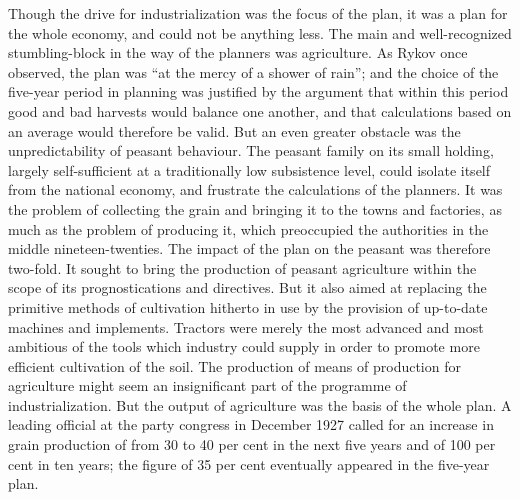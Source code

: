 Though the drive for industrialization was the focus of the plan, it was a plan for the whole economy, and could not be anything less. The main and well-recognized stumbling-block in the way of the planners was agriculture. As Rykov once observed, the plan was ``at the mercy of a shower of rain''; and the choice of the five-year period in planning was justified by the argument that within this period good and bad harvests would balance one another, and that calculations based on an average would therefore be valid. But an even greater obstacle was the unpredictability of peasant behaviour. The peasant family on its small holding, largely self-sufficient at a traditionally low subsistence level, could isolate itself from the national economy, and frustrate the calculations of the planners. It was the problem of collecting the grain and bringing it to the towns and factories, as much as the problem of producing it, which preoccupied the authorities in the middle nineteen-twenties. The impact of the plan on the peasant was therefore two-fold. It sought to bring the production of peasant agriculture within the scope of its prognostications and directives. But it also aimed at replacing the primitive methods of cultivation hitherto in use by the provision of up-to-date machines and implements. Tractors were merely the most advanced and most ambitious of the tools which industry could supply in order to promote more efficient cultivation of the soil. The production of means of production for agriculture might seem an insignificant part of the programme of industrialization. But the output of agriculture was the basis of the whole plan. A leading official at the party congress in December 1927 called for an increase in grain production of from 30 to 40 per cent in the next five years and of 100 per cent in ten years; the figure of 35 per cent eventually appeared in the five-year plan. 

